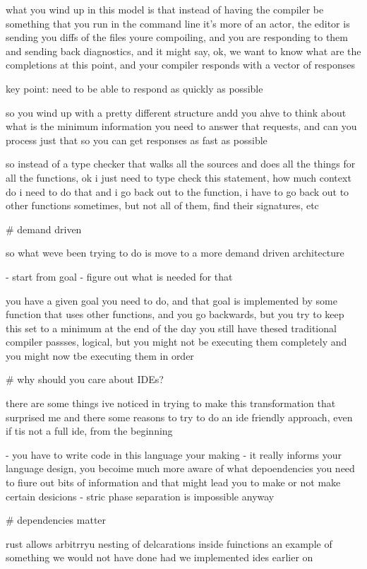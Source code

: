 \documentclass[12pt, a4paper]{report}
\begin{document}
what you wind up in this model is that instead of having the compiler be something that you run in the command line it's more of an actor, the editor is sending you diffs of the files youre compoiling, and you are responding to them and sending back diagnostics,
and it might say, ok, we want to know what are the completions at this point, and your compiler responds with a vector of responses

key point: need to be able to respond as quickly as possible

so you wind up with a pretty different structure
andd you ahve to think about what is the minimum information you need to answer that requests, and can you process just that so you can get responses as fast as possible

so instead of a type checker that walks all the sources and does all the things for all the functions, ok i just need to type  check this statement, how much context do i need to do that
and i go back out to the function, i have to go back out to other functions sometimes, but not all of them, find their signatures, etc

# demand driven

so what weve been trying to do is move to a more demand driven architecture

- start from goal
- figure out what is needed for that

you have a given goal you need to do, and that goal is implemented by some function that uses other functions, and you go backwards, but you try to keep this set to a minimum
at the end of the day you still have thesed traditional compiler passses, logical, but you might not be executing them completely and you might now tbe executing them in order

# why should you care about IDEs?

there are some things ive noticed in trying to make this transformation that surprised me
and there some reasons to try to do an ide friendly approach, even if tis not a full ide, from the beginning

- you have to write code in this language your making
- it really informs your language design,
  you becoime much more aware of what depoendencies you need to fiure out bits of information and that might lead you to make or not make certain desicions
- stric phase separation is impossible anyway

# dependencies matter

rust allows arbitrryu nesting of delcarations inside fuinctions
an example of something we would not have done had we implemented ides earlier on
\end{document}
